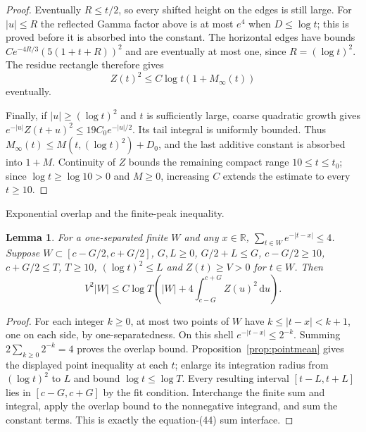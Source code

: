 \documentclass[11pt,a4paper]{article}
\numberwithin{equation}{section}
\newtheorem{lemma}[theorem]{Lemma}
\theoremstyle{definition}
\newcommand{\R}{\mathbb R}
\newcommand{\dd}{\,\mathrm d}
\newcommand{\zabs}{Z}
\begin{document}
\begin{proof}
Eventually $R\le t/2$, so every shifted height on the edges is still large.
For $|u|\le R$ the reflected Gamma factor above is at most $e^4$ when
$D\le\log t$; this is proved before it is absorbed into the constant.
The horizontal edges have bounds
$C e^{-4R/3}(5(1+t+R))^2$ and are eventually at most one, since
$R=(\log t)^2$. The residue rectangle therefore gives
\[
 \zabs(t)^2\le C\log t(1+M_\infty(t))
\]
eventually.

Finally, if $|u|\ge(\log t)^2$ and $t$ is sufficiently large, coarse quadratic
growth gives
$e^{-|u|}\zabs(t+u)^2\le19C_0e^{-|u|/2}$.
Its tail integral is uniformly bounded. Thus
$M_\infty(t)\le M(t,(\log t)^2)+D_0$, and the last additive constant is
absorbed into $1+M$. Continuity of $\zabs$ bounds the remaining compact range
$10\le t\le t_0$; since $\log t\ge\log10>0$ and $M\ge0$, increasing $C$
extends the estimate to every $t\ge10$.
\end{proof}

\par\medskip\noindent Exponential overlap and the finite-peak inequality.
\begin{lemma}\label{lem:equation44}
For a one-separated finite $W$ and any $x\in\R$,
$\sum_{t\in W}e^{-|t-x|}\le4$.
Suppose $W\subset[c-G/2,c+G/2]$, $G,L\ge0$, $G/2+L\le G$,
$c-G/2\ge10$, $c+G/2\le T$, $T\ge10$,
$(\log t)^2\le L$ and $\zabs(t)\ge V>0$ for $t\in W$. Then
\[
 V^2|W|\le C\log T\left(|W|+4\int_{c-G}^{c+G}\zabs(u)^2\dd u\right).
\]
\end{lemma}
\begin{proof}
For each integer $k\ge0$, at most two points of $W$ have
$k\le|t-x|<k+1$, one on each side, by one-separatedness. On this shell
$e^{-|t-x|}\le2^{-k}$. Summing $2\sum_{k\ge0}2^{-k}=4$ proves the overlap
bound. Proposition~\ref{prop:pointmean} gives the displayed point inequality
at each $t$; enlarge its integration radius from $(\log t)^2$ to $L$ and
bound $\log t\le\log T$. Every resulting interval $[t-L,t+L]$ lies in
$[c-G,c+G]$ by the fit condition. Interchange the finite sum and integral,
apply the overlap bound to the nonnegative integrand, and sum the constant
terms. This is exactly the equation-(44) sum interface.
\end{proof}
\end{document}
